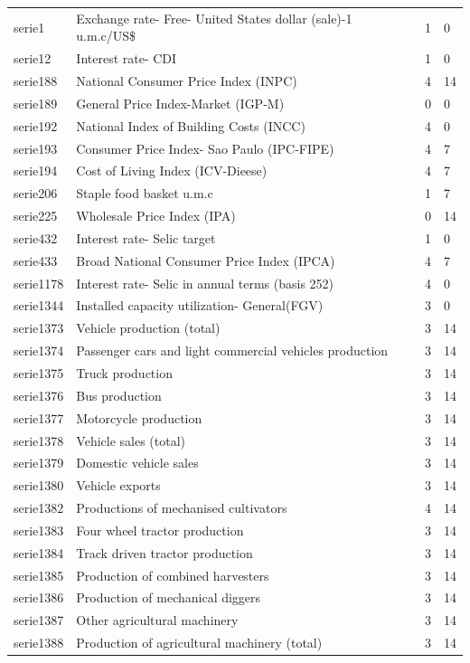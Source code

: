 \documentclass{article}
\begin{document}
{\begin{landscape}
\begin{center}
\begin{longtable}{|l|l|l|l|}
serie1 & Exchange rate- Free- United States dollar (sale)-1 u.m.c/US\$ & 1 & 0 \\
serie12 & Interest rate- CDI & 1 & 0 \\
serie188 & National Consumer Price Index (INPC) & 4 & 14 \\
serie189 & General Price Index-Market (IGP-M) & 0 & 0 \\
serie192 & National Index of Building Costs (INCC) & 4 & 0 \\
serie193 & Consumer Price Index- Sao Paulo (IPC-FIPE) & 4 & 7 \\
serie194 & Cost of Living Index (ICV-Dieese) & 4 & 7 \\
serie206 & Staple food basket u.m.c & 1 & 7 \\
serie225 & Wholesale Price Index (IPA) & 0 & 14 \\
serie432 & Interest rate- Selic target & 1 & 0 \\
serie433 & Broad National Consumer Price Index (IPCA) & 4 & 7 \\
serie1178 & Interest rate- Selic in annual terms (basis 252) & 4 & 0 \\
serie1344 & Installed capacity utilization- General(FGV) & 3 & 0 \\
serie1373 & Vehicle production (total) & 3 & 14 \\
serie1374 & Passenger cars and light commercial vehicles production & 3 & 14 \\
serie1375 & Truck production & 3 & 14 \\
serie1376 & Bus production & 3 & 14 \\
serie1377 & Motorcycle production & 3 & 14 \\
serie1378 & Vehicle sales (total) & 3 & 14 \\
serie1379 & Domestic vehicle sales & 3 & 14 \\
serie1380 & Vehicle exports & 3 & 14 \\
serie1382 & Productions of mechanised cultivators & 4 & 14 \\
serie1383 & Four wheel tractor production & 3 & 14 \\
serie1384 & Track driven tractor production & 3 & 14 \\
serie1385 & Production of combined harvesters & 3 & 14 \\
serie1386 & Production of mechanical diggers & 3 & 14 \\
serie1387 & Other agricultural machinery & 3 & 14 \\
serie1388 & Production of agricultural machinery (total) & 3 & 14 \\

\end{longtable}
\end{center}
\end{landscape}}
\end{document}
